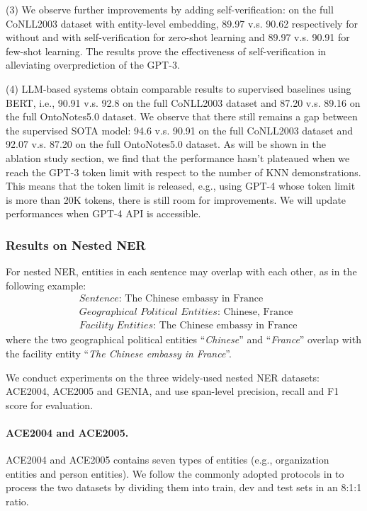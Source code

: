 \documentclass{article}
\begin{document}
(3) We observe further improvements by adding self-verification: on the full CoNLL2003 dataset with entity-level embedding, 89.97 v.s. 90.62 
respectively for without and with self-verification
for zero-shot learning and 89.97 v.s. 90.91 for few-shot learning. 
The results prove the effectiveness of self-verification in alleviating overprediction of the GPT-3.

(4) LLM-based systems obtain comparable results to supervised baselines using BERT, i.e., 90.91 v.s. 92.8 on the full CoNLL2003 dataset and 87.20 v.s. 89.16 on the full OntoNotes5.0 dataset.
We observe that there still remains a gap between the supervised SOTA model: 94.6 v.s. 90.91 on the full CoNLL2003 dataset and 92.07 v.s. 87.20 on the full OntoNotes5.0 dataset.
As will be shown in the ablation study section, 
we find that the performance hasn't plateaued when we reach the GPT-3 token limit with respect to the number of KNN demonstrations. 
This means that the token limit is released, e.g., using GPT-4 whose token limit is more than 20K tokens, 
there is still room for improvements. 
We will update performances when  GPT-4 API is accessible.


\subsubsection{Results on Nested NER}
For nested NER, entities in each sentence may overlap with each other, as in the following example:
\begin{equation}
\nonumber
    \begin{aligned}
    	&\textit{Sentence}\text{: The Chinese embassy in France}\\
    	&\textit{Geographical Political Entities}\text{: Chinese, France}\\
    	&\textit{Facility Entities}\text{: The Chinese embassy in France}
    \end{aligned}
\end{equation}
where the two geographical political entities “\textit{Chinese}” and “\textit{France}” overlap with the facility entity “\textit{The Chinese embassy in France}”.

We conduct experiments on the three widely-used nested NER  datasets: ACE2004, ACE2005 and GENIA, and use span-level precision, recall and F1 score for evaluation.

\paragraph{ACE2004 and ACE2005.}
ACE2004 \citep{doddington2004automatic} and ACE2005 \citep{christopher2006ace} contains seven types of entities (e.g., organization entities and person entities). We follow the commonly adopted protocols in \citet{katiyar2018nested} to process the two datasets by dividing them into train, dev and test sets in an 8:1:1 ratio. 
\end{document}

